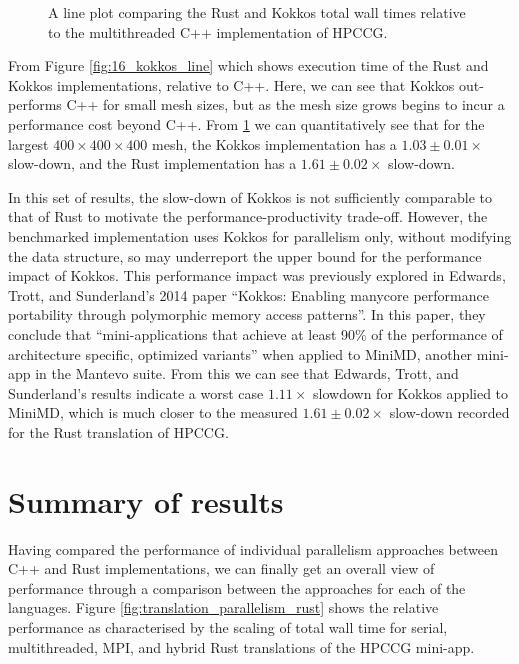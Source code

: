 \begin{figure}[H]
    \centering
    
    \caption{A line plot comparing the Rust and Kokkos total wall times relative to the multithreaded C++ implementation of HPCCG.}
    \label{fig:17_kokkos_line_relative}
\end{figure}


From Figure \ref{fig:16_kokkos_line} which shows execution time of the Rust and Kokkos implementations, relative to C++. Here, we can see that Kokkos out-performs C++ for small mesh sizes, but as the mesh size grows begins to incur a performance cost beyond C++. From \ref{fig:17_kokkos_line_relative} we can quantitatively see that for the largest $400 \times 400 \times 400$ mesh, the Kokkos implementation has a $1.03 \pm 0.01 \times$ slow-down, and the Rust implementation has a $1.61 \pm 0.02 \times$ slow-down. 

In this set of results, the slow-down of Kokkos is not sufficiently comparable to that of Rust to motivate the performance-productivity trade-off. However, the benchmarked implementation uses Kokkos for parallelism only, without modifying the data structure, so may underreport the upper bound for the performance impact of Kokkos. This performance impact was previously explored in Edwards, Trott, and Sunderland's 2014 paper ``Kokkos: Enabling manycore performance portability through polymorphic memory access patterns''. In this paper, they conclude that ``mini-applications that achieve at least 90\% of the performance of architecture specific, optimized variants'' \cite{carteredwardsKokkosEnablingManycore2014} when applied to MiniMD, another mini-app in the Mantevo suite. From this we can see that Edwards, Trott, and Sunderland's results indicate a worst case $1.11 \times$ slowdown for Kokkos applied to MiniMD, which is much closer to the measured $1.61 \pm 0.02 \times$ slow-down recorded for the Rust translation of HPCCG.

\section{Summary of results}
\label{sec:performance-results}

Having compared the performance of individual parallelism approaches between C++ and Rust implementations, we can finally get an overall view of performance through a comparison between the approaches for each of the languages. Figure \ref{fig:translation_parallelism_rust} shows the relative performance as characterised by the scaling of total wall time for serial, multithreaded, MPI, and hybrid Rust translations of the HPCCG mini-app.

